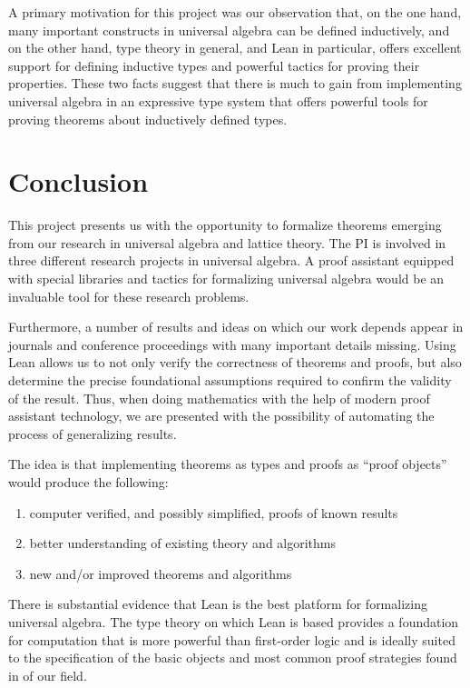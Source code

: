 \documentclass[11pt]{amsart}  %
\begin{document}
A primary motivation for this project was our observation that, on the one hand, many important constructs in universal algebra can be defined inductively, and on the other hand, type theory in general, and Lean in particular, offers excellent support for defining inductive types and powerful tactics for proving their properties. These two facts suggest that there is much to gain from implementing universal algebra in an expressive type system that offers powerful tools for proving theorems about inductively defined types.


\section{Conclusion} 
This project presents us with the opportunity to formalize theorems emerging from our research in universal algebra and lattice theory. The PI is involved in three different research projects in universal algebra.  A proof assistant equipped with special libraries and tactics for formalizing universal algebra would be an invaluable tool for these research problems. 

Furthermore, a number of results and ideas on which our work depends appear in journals and conference proceedings with many important details missing.  Using Lean allows us to not only verify the correctness of theorems and proofs, but also determine the precise foundational assumptions required to confirm the validity of the result. Thus, when doing mathematics with the help of modern proof assistant technology,  we are presented with the possibility of automating the process of generalizing results.

The idea is that implementing theorems as types and proofs as ``proof objects'' would produce the following:
\begin{enumerate}
\item computer verified, and possibly simplified, proofs of known results
\item better understanding of existing theory and algorithms
\item new and/or improved theorems and algorithms
\end{enumerate}

There is substantial evidence that Lean is the best platform for formalizing universal algebra.  The type theory on which Lean is based provides a foundation for computation that is more powerful than first-order logic and is ideally suited to the specification of the basic objects and most common proof strategies found in of our field.
\end{document}
